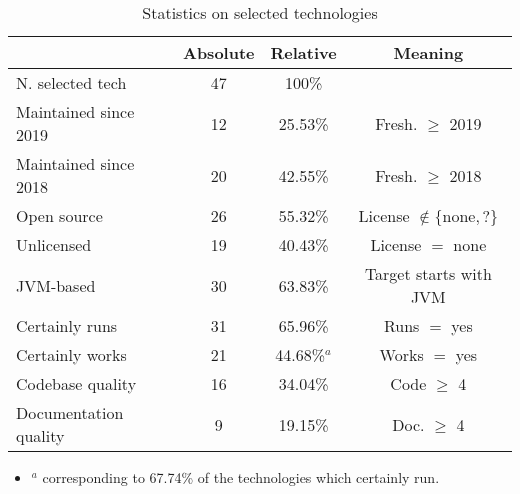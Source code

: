 \begin{table}
\caption{Statistics on selected technologies}
\label{tab:tech-stats}
\centering
\begin{tabular}{l||ccc}
\multicolumn{1}{c}{\textbf{}} & \textbf{Absolute} & \textbf{Relative} & \textbf{Meaning}                              \\
\hline\hline
N. selected tech              & 47                & 100\%             &                                               \\
\hline
Maintained since 2019         & 12                & 25.53\%           & Fresh. $\geq$ 2019                            \\
\hline
Maintained since 2018         & 20                & 42.55\%           & Fresh. $\geq$ 2018                            \\
\hline
Open source                   & 26                & 55.32\%           & License $\not\in \{ \text{none}, \text{?} \}$ \\
\hline
Unlicensed                    & 19                & 40.43\%           & License $=$ none                              \\
\hline
JVM-based                     & 30                & 63.83\%           & Target starts with JVM                        \\
\hline
Certainly runs                & 31                & 65.96\%           & Runs $=$ yes                                  \\
\hline
Certainly works               & 21                & 44.68\%$^a$       & Works $=$ yes                                 \\
\hline
Codebase quality              & 16                & 34.04\%           & Code $\geq$ 4                                 \\
\hline
Documentation quality         & 9                 & 19.15\%           & Doc. $\geq$ 4                                 \\
\hline\hline
\end{tabular}
\begin{itemize}
	\item[] $^a$ corresponding to 67.74\% of the technologies which certainly run.
\end{itemize}
\end{table}